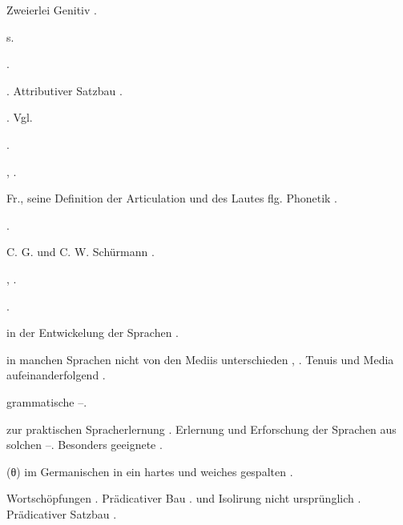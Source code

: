 \begin{register}

 Zweierlei Genitiv \pageref{sp.463}.

 s. 

 \pageref{sp.160}.

 \sed{\pageref{sp.344}}. Attributiver Satzbau \pageref{sp.453}.

 . Vgl. 


 \pageref{sp.280}.

 \pageref{sp.231}, \pageref{sp.245}.

 Fr., seine Definition der Articulation und des Lautes \pageref{sp.4} flg. Phonetik \pageref{sp.38}.

 \pageref{sp.282}.

 C. G. und C. W. Schürmann \pageref{sp.194}.


 \pageref{sp.150}, \pageref{sp.282}.

 \pageref{sp.383}.

 in der Entwickelung der Sprachen \pageref{sp.178}.

 in manchen Sprachen nicht von den Mediis unterschieden \pageref{sp.188}, \pageref{sp.194}\sed{, \pageref{sp.314}}. Tenuis und Media aufeinanderfolgend \pageref{sp.201}\sed{, \pageref{sp.298}}.

 grammatische \pageref{sp.114}–\pageref{sp.116}.

 zur praktischen Spracherlernung \pageref{sp.51}. Erlernung und Erforschung der Sprachen aus solchen \pageref{sp.73}–\pageref{sp.75}. Besonders geeignete \pageref{sp.106}.

 (θ) im Germanischen in ein hartes und weiches gespalten \pageref{sp.190}.

 Wortschöpfungen \pageref{sp.42}.  Prädicativer Bau \sed{\pageref{sp.149},} \pageref{sp.151}.   und Isolirung nicht ursprünglich \pageref{sp.257}.  Prädicativer Satzbau \pageref{sp.452}.


\end{register}

